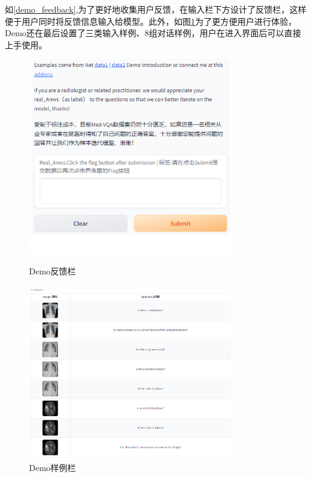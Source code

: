 如\ref{demo_feedback},为了更好地收集用户反馈，在输入栏下方设计了反馈栏，这样便于用户同时将反馈信息输入给模型。此外，如图\ref{demo_example}为了更方便用户进行体验，Demo还在最后设置了三类输入样例、8组对话样例，用户在进入界面后可以直接上手使用。
\begin{figure}[htbp]
	\begin{minipage}{0.5\linewidth}
		\centering	
		\includegraphics[width=0.8\textwidth]{Fig/myfig/chapter5/demo_feedback.png}  %
		\caption{\label{demo_feedback}Demo反馈栏} 	
	\end{minipage}
	\begin{minipage}{0.5\linewidth}
		\centering	
		\includegraphics[width=0.8\textwidth]{Fig/myfig/chapter5/demo_example.png}  %
		\caption{\label{demo_example}Demo样例栏} 
	\end{minipage}
\end{figure}

